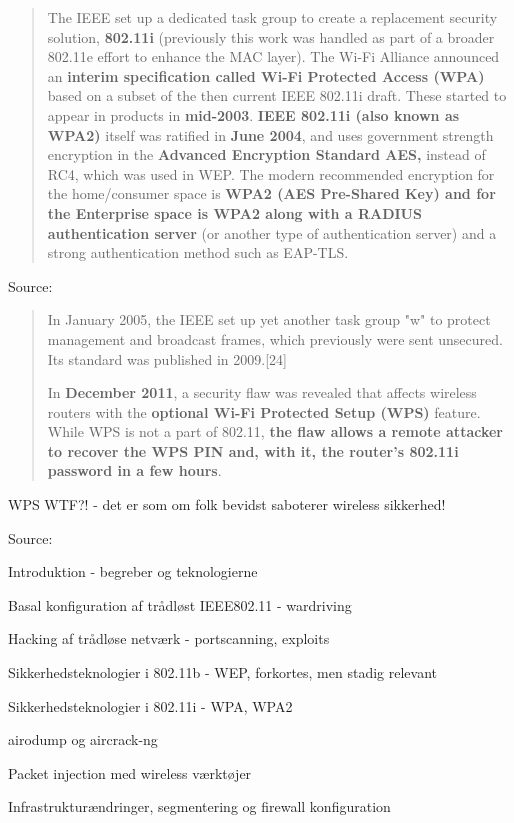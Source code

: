 \documentclass[20pt,landscape,a4paper,footrule]{foils}
\begin{document}

\begin{quote}
The IEEE set up a dedicated task group to create a replacement security solution, {\bf 802.11i} (previously this work was handled as part of a broader 802.11e effort to enhance the MAC layer). The Wi-Fi Alliance announced an {\bf interim specification called Wi-Fi Protected Access (WPA)} based on a subset of the then current IEEE 802.11i draft. These started to appear in products in {\bf mid-2003}. {\bf IEEE 802.11i (also known as WPA2)} itself was ratified in {\bf June 2004}, and uses government strength encryption in the {\bf Advanced Encryption Standard AES,} instead of RC4, which was used in WEP. The modern recommended encryption for the home/consumer space is {\bf WPA2 (AES Pre-Shared Key) and for the Enterprise space is WPA2 along with a RADIUS authentication server} (or another type of authentication server) and a strong authentication method such as EAP-TLS.
\end{quote}
Source: 


\begin{quote}
In January 2005, the IEEE set up yet another task group "w" to protect management and broadcast frames, which previously were sent unsecured. Its standard was published in 2009.[24]

In {\bf December 2011}, a security flaw was revealed that affects wireless routers with the {\bf optional Wi-Fi Protected Setup (WPS)} feature. While WPS is not a part of 802.11, {\bf the flaw allows a remote attacker to recover the WPS PIN and, with it, the router's 802.11i password in a few hours}.
\end{quote}

\vskip 2cm
\centerline{WPS WTF?! - det er som om folk bevidst saboterer wireless sikkerhed!}
\vskip 2cm

Source: 




\begin{list1}
\item Introduktion - begreber og teknologierne
\item Basal konfiguration af trådløst IEEE802.11 - wardriving
\item Hacking af trådløse netværk - portscanning, exploits
\item Sikkerhedsteknologier i 802.11b - WEP, forkortes, men stadig relevant
\item Sikkerhedsteknologier i 802.11i - WPA, WPA2
\item airodump og aircrack-ng
\item Packet injection med wireless værktøjer
\item Infrastrukturændringer, segmentering og firewall konfiguration
\end{list1}
\end{document}
